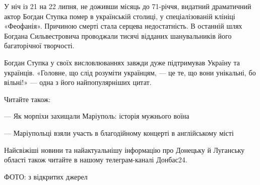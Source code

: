 У ніч із 21 на 22 липня, не доживши місяць до 71-річчя, видатний драматичний
актор Богдан Ступка помер в українській столиці, у спеціалізованій клініці
«Феофанія». Причиною смерті стала серцева недостатність. В останній шлях
Богдана Сильвестровича проводжали тисячі відданих шанувальників його
багаторічної творчості. 

Богдан Ступка у своїх висловлюваннях завжди дуже підтримував Україну та
українців. «Головне, що слід розуміти українцям, — це те, що вони унікальні, бо
вільні!» — одна з його найпопулярніших цитат.

Читайте також:

— Як морпіхи захищали Маріуполь: історія мужнього воїна

— Маріупольці взяли участь в благодійному концерті в англійському місті

Найсвіжіші новини та найактуальнішу інформацію про Донецьку й Луганську області
також читайте в нашому телеграм-каналі Донбас24.

ФОТО: з відкритих джерел
